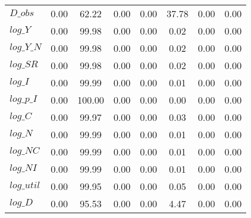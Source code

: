 \begin{center}
\begin{longtable}{lccccccc}
$D\_obs     $	 & 	        0.00	 & 	       62.22	 & 	        0.00	 & 	        0.00	 & 	       37.78	 & 	        0.00	 & 	        0.00 \\ 
$log\_Y     $	 & 	        0.00	 & 	       99.98	 & 	        0.00	 & 	        0.00	 & 	        0.02	 & 	        0.00	 & 	        0.00 \\ 
$log\_Y\_N  $	 & 	        0.00	 & 	       99.98	 & 	        0.00	 & 	        0.00	 & 	        0.02	 & 	        0.00	 & 	        0.00 \\ 
$log\_SR    $	 & 	        0.00	 & 	       99.98	 & 	        0.00	 & 	        0.00	 & 	        0.02	 & 	        0.00	 & 	        0.00 \\ 
$log\_I     $	 & 	        0.00	 & 	       99.99	 & 	        0.00	 & 	        0.00	 & 	        0.01	 & 	        0.00	 & 	        0.00 \\ 
$log\_p\_I  $	 & 	        0.00	 & 	      100.00	 & 	        0.00	 & 	        0.00	 & 	        0.00	 & 	        0.00	 & 	        0.00 \\ 
$log\_C     $	 & 	        0.00	 & 	       99.97	 & 	        0.00	 & 	        0.00	 & 	        0.03	 & 	        0.00	 & 	        0.00 \\ 
$log\_N     $	 & 	        0.00	 & 	       99.99	 & 	        0.00	 & 	        0.00	 & 	        0.01	 & 	        0.00	 & 	        0.00 \\ 
$log\_NC    $	 & 	        0.00	 & 	       99.99	 & 	        0.00	 & 	        0.00	 & 	        0.01	 & 	        0.00	 & 	        0.00 \\ 
$log\_NI    $	 & 	        0.00	 & 	       99.99	 & 	        0.00	 & 	        0.00	 & 	        0.01	 & 	        0.00	 & 	        0.00 \\ 
$log\_util  $	 & 	        0.00	 & 	       99.95	 & 	        0.00	 & 	        0.00	 & 	        0.05	 & 	        0.00	 & 	        0.00 \\ 
$log\_D     $	 & 	        0.00	 & 	       95.53	 & 	        0.00	 & 	        0.00	 & 	        4.47	 & 	        0.00	 & 	        0.00 \\ 
\end{longtable}
 \end{center}
